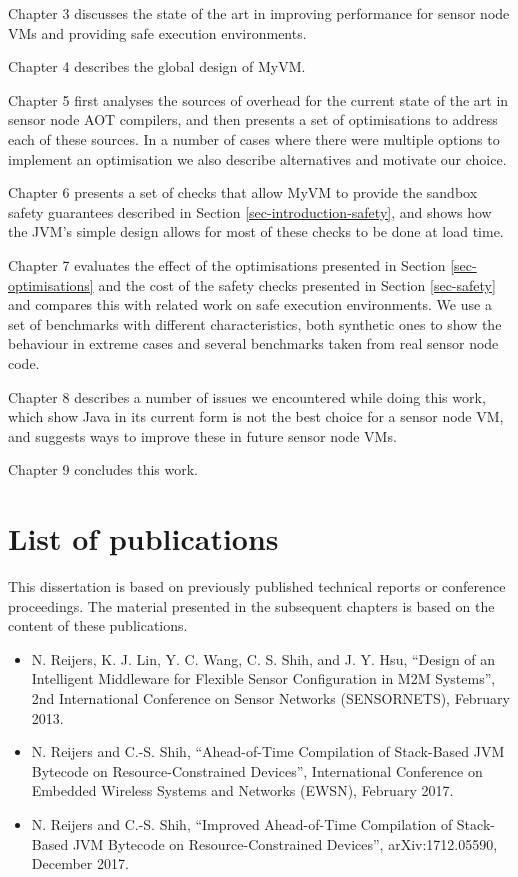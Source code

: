 Chapter 3 discusses the state of the art in improving performance for sensor node VMs and providing safe execution environments.

Chapter 4 describes the global design of MyVM.

Chapter 5 first analyses the sources of overhead for the current state of the art in sensor node AOT compilers, and then presents a set of optimisations to address each of these sources. In a number of cases where there were multiple options to implement an optimisation we also describe alternatives and motivate our choice.

Chapter 6 presents a set of checks that allow MyVM to provide the sandbox safety guarantees described in Section \ref{sec-introduction-safety}, and shows how the JVM's simple design allows for most of these checks to be done at load time.

Chapter 7 evaluates the effect of the optimisations presented in Section \ref{sec-optimisations} and the cost of the safety checks presented in Section \ref{sec-safety} and compares this with related work on safe execution environments. We use a set of benchmarks with different characteristics, both synthetic ones to show the behaviour in extreme cases and several benchmarks taken from real sensor node code.

Chapter 8 describes a number of issues we encountered while doing this work, which show Java in its current form is not the best choice for a sensor node VM, and suggests ways to improve these in future sensor node VMs.

Chapter 9 concludes this work.

\section{List of publications}
This dissertation is based on previously published technical reports or conference proceedings. The material presented in the subsequent chapters is based on the content of these publications.

\begin{itemize}
	\item N. Reijers, K. J. Lin, Y. C. Wang, C. S. Shih, and J. Y. Hsu, “Design of an Intelligent Middleware for Flexible Sensor Configuration in M2M Systems”, 2nd International Conference on Sensor Networks (SENSORNETS), February 2013.
	\item N. Reijers and C.-S. Shih, “Ahead-of-Time Compilation of Stack-Based JVM Bytecode on Resource-Constrained Devices”, International Conference on Embedded Wireless Systems and Networks (EWSN), February 2017.
	\item N. Reijers and C.-S. Shih, “Improved Ahead-of-Time Compilation of Stack-Based JVM Bytecode on Resource-Constrained Devices”, arXiv:1712.05590, December 2017.
\end{itemize}

